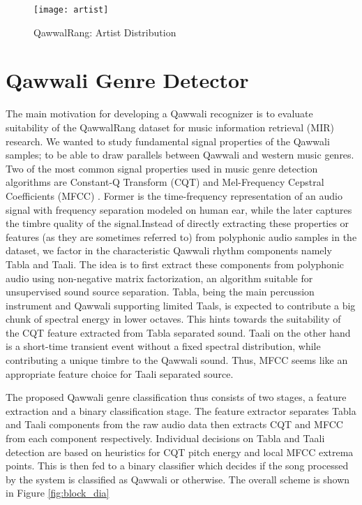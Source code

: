 \documentclass{article}
\begin{document}
\begin{figure}[htbp]
  \centering
  \texttt{[image: artist]}
  \caption{QawwalRang: Artist Distribution}
\label{fig:author_dist}
\end{figure}

\section{Qawwali Genre Detector}\label{sec:detector}

The main motivation for developing a Qawwali recognizer is to evaluate suitability of the QawwalRang dataset for music information retrieval (MIR) research. We wanted to study fundamental signal properties of the Qawwali samples; to be able to draw parallels between Qawwali and western music genres. Two of the most common signal properties used in music genre detection algorithms are Constant-Q Transform (CQT) and Mel-Frequency Cepstral Coefficients (MFCC) \citep{panagakis}. Former is the time-frequency representation of an audio signal with frequency separation modeled on human ear, while the later captures the timbre quality of the signal.Instead of directly extracting these properties or features (as they are sometimes referred to) from polyphonic audio samples in the dataset, we factor in the characteristic Qawwali rhythm components namely Tabla and Taali. The idea is to first extract these components from polyphonic audio using non-negative matrix factorization, an algorithm \citep{virtanen} suitable for unsupervised sound source separation. Tabla, being the main percussion instrument and Qawwali supporting limited Taals, is expected to contribute a big chunk of spectral energy in lower octaves. This hints towards the suitability of the CQT feature extracted from Tabla separated sound. Taali on the other hand is a short-time transient event without a fixed spectral distribution, while contributing a unique timbre to the Qawwali sound. Thus, MFCC seems like an appropriate feature choice for Taali separated source.

The proposed Qawwali genre classification thus consists of two stages, a feature extraction and a binary classification stage. The feature extractor separates Tabla and Taali components from the raw audio data then extracts CQT and MFCC from each component respectively. Individual decisions on Tabla and Taali detection are based on heuristics for CQT pitch energy and local MFCC extrema points. This is then fed to a binary classifier which decides if the song processed by the system is classified as Qawwali or otherwise. The overall scheme is shown in Figure \ref{fig:block_dia}
\end{document}
